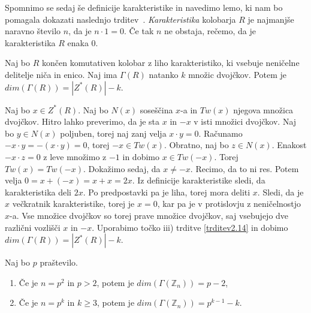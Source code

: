 \documentclass[mat1, tisk]{fmfdelo}
\newcommand{\Z}{\mathbb Z}
\begin{document}
%
Spomnimo se sedaj še definicije karakteristike in navedimo lemo, ki nam bo pomagala dokazati 
naslednjo trditev~\cite{PIRZADA2019}. \emph{Karakteristika} kolobarja $R$ je najmanjše naravno število $n$, da je 
$n \cdot 1 = 0$. Če tak $n$ ne obstaja, rečemo, da je karakteristika $R$ enaka $0$.
%
\begin{lema}\label{lema3.3}
  Naj bo $R$ končen komutativen kolobar z liho karakteristiko, ki vsebuje neničelne delitelje niča in enico. Naj 
  ima $\Gamma(R)$ natanko $k$ množic dvojčkov. Potem je $dim(\Gamma(R)) = |Z^*(R)| - k$.
\end{lema}
\begin{dokaz}
  Naj bo $x \in Z^*(R)$. Naj bo $N(x)$ soseščina $x$-a in $Tw(x)$ njegova množica dvojčkov. Hitro lahko 
  preverimo, da je sta $x$ in $-x$ v isti množici dvojčkov. Naj bo $y \in N(x)$ poljuben, torej naj zanj 
  velja $x \cdot y = 0$. Računamo $-x \cdot y = - (x \cdot y)= 0$, torej $-x \in Tw(x)$. Obratno, naj 
  bo $z \in N(x)$. Enakost $-x \cdot z = 0$ z leve množimo z $-1$ in dobimo $x \in Tw(-x)$. Torej 
  $Tw(x) = Tw(-x)$. Dokažimo sedaj, da $x \neq -x$. Recimo, da to ni res. Potem velja $0 = x + (-x) = x + x = 2x$. 
  Iz definicije karakteristike sledi, da karakteristika deli $2x$. Po predpostavki pa je liha, torej mora 
  deliti $x$. Sledi, da je $x$ večkratnik karakteristike, torej je $x = 0$, kar pa je v protislovju z 
  neničelnostjo $x$-a. Vse množice dvojčkov so torej prave množice dvojčkov, saj vsebujejo dve različni 
  vozlišči $x$ in $-x$. Uporabimo točko iii) trditve \ref{trditev2.14} in dobimo $dim(\Gamma(R)) = |Z^*(R)| - k$.
\end{dokaz}
%
\begin{trditev}
  Naj bo $p$ praštevilo.
  \begin{enumerate}[label=(\roman*)]
      \item Če je $n = p^2$ in $p > 2$, potem je $dim(\Gamma(\Z_{n})) = p - 2$,
      \item Če je $n = p^k$ in $k \geq 3$, potem je $dim(\Gamma(\Z_{n})) = p^{k-1} - k$.
  \end{enumerate}
\end{trditev}
\end{document}
